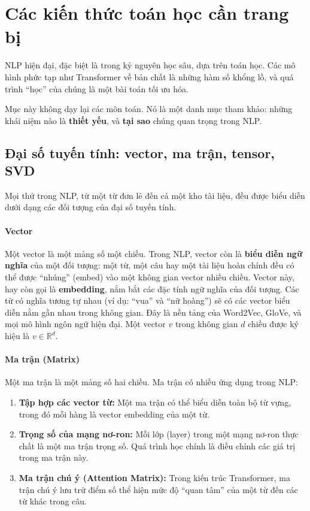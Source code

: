 
\section{Các kiến thức toán học cần trang bị}
\label{sec:kien_thuc_toan_hoc}

NLP hiện đại, đặc biệt là trong kỷ nguyên học sâu, dựa trên toán học. Các mô hình phức tạp như Transformer về bản chất là những hàm số khổng lồ, và quá trình “học” của chúng là một bài toán tối ưu hóa.

Mục này không dạy lại các môn toán. Nó là một danh mục tham khảo: những khái niệm nào là \textbf{thiết yếu}, và \textbf{tại sao} chúng quan trọng trong NLP.

\subsection{Đại số tuyến tính: vector, ma trận, tensor, SVD}
\label{ssec:dai_so_tuyen_tinh}
Mọi thứ trong NLP, từ một từ đơn lẻ đến cả một kho tài liệu, đều được biểu diễn dưới dạng các đối tượng của đại số tuyến tính.

\paragraph{Vector}
Một vector là một mảng số một chiều. Trong NLP, vector còn là \textbf{biểu diễn ngữ nghĩa} của một đối tượng: một từ, một câu hay một tài liệu hoàn chỉnh đều có thể được “nhúng” (embed) vào một không gian vector nhiều chiều. Vector này, hay còn gọi là \textbf{embedding}, nắm bắt các đặc tính ngữ nghĩa của đối tượng. Các từ có nghĩa tương tự nhau (ví dụ: “vua” và “nữ hoàng”) sẽ có các vector biểu diễn nằm gần nhau trong không gian. Đây là nền tảng của Word2Vec, GloVe, và mọi mô hình ngôn ngữ hiện đại. Một vector $v$ trong không gian $d$ chiều được ký hiệu là $v \in \mathbb{R}^d$.

\paragraph{Ma trận (Matrix)}
Một ma trận là một mảng số hai chiều. Ma trận có nhiều ứng dụng trong NLP:
\begin{enumerate}
    \item \textbf{Tập hợp các vector từ:} Một ma trận có thể biểu diễn toàn bộ từ vựng, trong đó mỗi hàng là vector embedding của một từ.
    \item \textbf{Trọng số của mạng nơ-ron:} Mỗi lớp (layer) trong một mạng nơ-ron thực chất là một ma trận trọng số. Quá trình học chính là điều chỉnh các giá trị trong ma trận này.
    \item \textbf{Ma trận chú ý (Attention Matrix):} Trong kiến trúc Transformer, ma trận chú ý lưu trữ điểm số thể hiện mức độ “quan tâm” của một từ đến các từ khác trong câu.
\end{enumerate}

